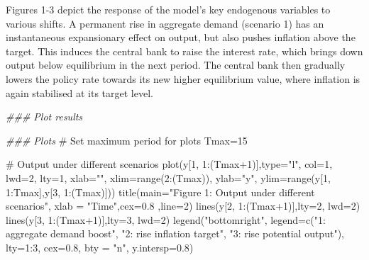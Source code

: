 \documentclass[
  letterpaper,
  DIV=11,
  numbers=noendperiod]{scrreprt}
\newenvironment{Shaded}{\begin{snugshade}}{\end{snugshade}}
\newcommand{\AttributeTok}[1]{\textcolor[rgb]{0.40,0.45,0.13}{#1}}
\newcommand{\CommentTok}[1]{\textcolor[rgb]{0.37,0.37,0.37}{#1}}
\newcommand{\DecValTok}[1]{\textcolor[rgb]{0.68,0.00,0.00}{#1}}
\newcommand{\DocumentationTok}[1]{\textcolor[rgb]{0.37,0.37,0.37}{\textit{#1}}}
\newcommand{\FloatTok}[1]{\textcolor[rgb]{0.68,0.00,0.00}{#1}}
\newcommand{\FunctionTok}[1]{\textcolor[rgb]{0.28,0.35,0.67}{#1}}
\newcommand{\NormalTok}[1]{\textcolor[rgb]{0.00,0.23,0.31}{#1}}
\newcommand{\OtherTok}[1]{\textcolor[rgb]{0.00,0.23,0.31}{#1}}
\newcommand{\SpecialCharTok}[1]{\textcolor[rgb]{0.37,0.37,0.37}{#1}}
\newcommand{\StringTok}[1]{\textcolor[rgb]{0.13,0.47,0.30}{#1}}
\begin{document}
Figures 1-3 depict the response of the model's key endogenous variables
to various shifts. A permanent rise in aggregate demand (scenario 1) has
an instantaneous expansionary effect on output, but also pushes
inflation above the target. This induces the central bank to raise the
interest rate, which brings down output below equilibrium in the next
period. The central bank then gradually lowers the policy rate towards
its new higher equilibrium value, where inflation is again stabilised at
its target level.

\begin{Shaded}
\begin{Highlighting}[]
\DocumentationTok{\#\#\# Plot results}

\DocumentationTok{\#\#\# Plots}
\CommentTok{\# Set maximum period for plots}
\NormalTok{Tmax}\OtherTok{=}\DecValTok{15}

\CommentTok{\# Output under different scenarios}
\FunctionTok{plot}\NormalTok{(y[}\DecValTok{1}\NormalTok{, }\DecValTok{1}\SpecialCharTok{:}\NormalTok{(Tmax}\SpecialCharTok{+}\DecValTok{1}\NormalTok{)],}\AttributeTok{type=}\StringTok{"l"}\NormalTok{, }\AttributeTok{col=}\DecValTok{1}\NormalTok{, }\AttributeTok{lwd=}\DecValTok{2}\NormalTok{, }\AttributeTok{lty=}\DecValTok{1}\NormalTok{, }\AttributeTok{xlab=}\StringTok{""}\NormalTok{, }\AttributeTok{xlim=}\FunctionTok{range}\NormalTok{(}\DecValTok{2}\SpecialCharTok{:}\NormalTok{(Tmax)), }\AttributeTok{ylab=}\StringTok{"y"}\NormalTok{, }\AttributeTok{ylim=}\FunctionTok{range}\NormalTok{(y[}\DecValTok{1}\NormalTok{, }\DecValTok{1}\SpecialCharTok{:}\NormalTok{Tmax],y[}\DecValTok{3}\NormalTok{, }\DecValTok{1}\SpecialCharTok{:}\NormalTok{(Tmax)])) }
\FunctionTok{title}\NormalTok{(}\AttributeTok{main=}\StringTok{"Figure 1: Output under different scenarios"}\NormalTok{, }\AttributeTok{xlab =} \StringTok{"Time"}\NormalTok{,}\AttributeTok{cex=}\FloatTok{0.8}\NormalTok{ ,}\AttributeTok{line=}\DecValTok{2}\NormalTok{)}
\FunctionTok{lines}\NormalTok{(y[}\DecValTok{2}\NormalTok{, }\DecValTok{1}\SpecialCharTok{:}\NormalTok{(Tmax}\SpecialCharTok{+}\DecValTok{1}\NormalTok{)],}\AttributeTok{lty=}\DecValTok{2}\NormalTok{, }\AttributeTok{lwd=}\DecValTok{2}\NormalTok{)}
\FunctionTok{lines}\NormalTok{(y[}\DecValTok{3}\NormalTok{, }\DecValTok{1}\SpecialCharTok{:}\NormalTok{(Tmax}\SpecialCharTok{+}\DecValTok{1}\NormalTok{)],}\AttributeTok{lty=}\DecValTok{3}\NormalTok{, }\AttributeTok{lwd=}\DecValTok{2}\NormalTok{)}
\FunctionTok{legend}\NormalTok{(}\StringTok{"bottomright"}\NormalTok{, }\AttributeTok{legend=}\FunctionTok{c}\NormalTok{(}\StringTok{"1: aggregate demand boost"}\NormalTok{, }\StringTok{"2: rise inflation target"}\NormalTok{, }\StringTok{"3: rise potential output"}\NormalTok{), }\AttributeTok{lty=}\DecValTok{1}\SpecialCharTok{:}\DecValTok{3}\NormalTok{, }\AttributeTok{cex=}\FloatTok{0.8}\NormalTok{, }\AttributeTok{bty =} \StringTok{"n"}\NormalTok{, }\AttributeTok{y.intersp=}\FloatTok{0.8}\NormalTok{)}
\end{Highlighting}
\end{Shaded}
\end{document}
